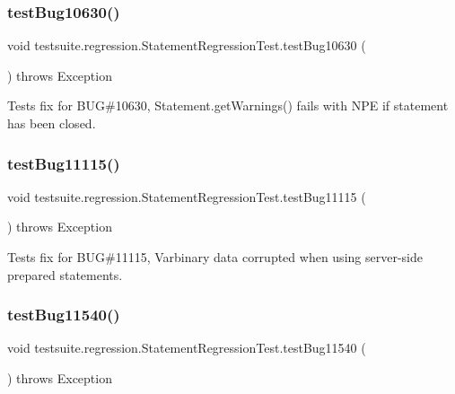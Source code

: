 \subsubsection{\texorpdfstring{test\+Bug10630()}{testBug10630()}}
{\footnotesize\ttfamily void testsuite.\+regression.\+Statement\+Regression\+Test.\+test\+Bug10630 (\begin{DoxyParamCaption}{ }\end{DoxyParamCaption}) throws Exception}

Tests fix for B\+UG\#10630, Statement.\+get\+Warnings() fails with N\+PE if statement has been closed. \mbox{\label{classtestsuite_1_1regression_1_1_statement_regression_test_a5eed5fd0591511a13f3159bd29366e80}} 
\subsubsection{\texorpdfstring{test\+Bug11115()}{testBug11115()}}
{\footnotesize\ttfamily void testsuite.\+regression.\+Statement\+Regression\+Test.\+test\+Bug11115 (\begin{DoxyParamCaption}{ }\end{DoxyParamCaption}) throws Exception}

Tests fix for B\+UG\#11115, Varbinary data corrupted when using server-\/side prepared statements. \mbox{\label{classtestsuite_1_1regression_1_1_statement_regression_test_a604d1382ce11355dcdefb57bccf8fc4b}} 
\subsubsection{\texorpdfstring{test\+Bug11540()}{testBug11540()}}
{\footnotesize\ttfamily void testsuite.\+regression.\+Statement\+Regression\+Test.\+test\+Bug11540 (\begin{DoxyParamCaption}{ }\end{DoxyParamCaption}) throws Exception}

